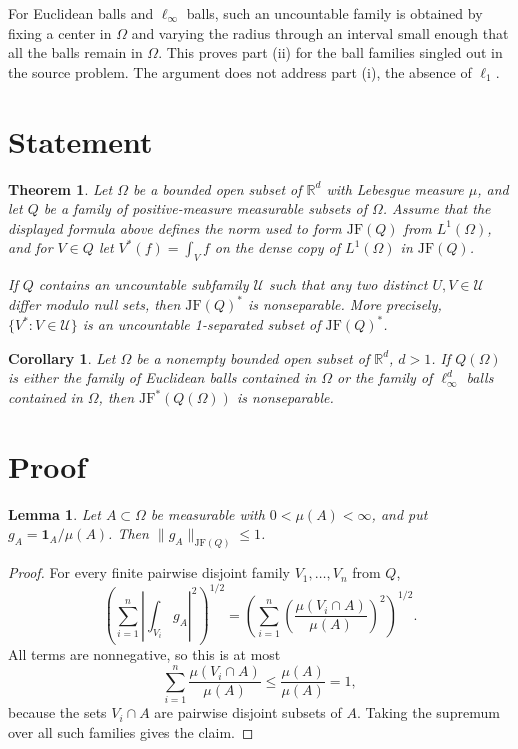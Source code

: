 \documentclass[11pt]{article}
\newtheorem{theorem}{Theorem}
\newtheorem{lemma}{Lemma}
\newtheorem{corollary}{Corollary}
\newcommand{\JF}{\mathrm{JF}}
\newcommand{\R}{\mathbb{R}}
\newcommand{\1}{\mathbf{1}}
\begin{document}
For Euclidean balls and $\ell_\infty$ balls, such an uncountable family is
obtained by fixing a center in $\Omega$ and varying the radius through an
interval small enough that all the balls remain in $\Omega$.  This proves part
(ii) for the ball families singled out in the source problem.  The argument
does not address part (i), the absence of $\ell_1$.

\section{Statement}

\begin{theorem}\label{thm:uncountable-separated}
Let $\Omega$ be a bounded open subset of $\R^d$ with Lebesgue measure $\mu$,
and let $Q$ be a family of positive-measure measurable subsets of $\Omega$.
Assume that the displayed formula above defines the norm used to form
$\JF(Q)$ from $L^1(\Omega)$, and for $V\in Q$ let
$V^*(f)=\int_V f$ on the dense copy of $L^1(\Omega)$ in $\JF(Q)$.

If $Q$ contains an uncountable subfamily $\mathcal U$ such that any two
distinct $U,V\in\mathcal U$ differ modulo null sets, then $\JF(Q)^*$ is
nonseparable.  More precisely, $\{V^*:V\in\mathcal U\}$ is an uncountable
1-separated subset of $\JF(Q)^*$.
\end{theorem}

\begin{corollary}\label{cor:balls}
Let $\Omega$ be a nonempty bounded open subset of $\R^d$, $d>1$.  If
$Q(\Omega)$ is either the family of Euclidean balls contained in $\Omega$ or
the family of $\ell_\infty^d$ balls contained in $\Omega$, then
$\JF^*(Q(\Omega))$ is nonseparable.
\end{corollary}

\section{Proof}

\begin{lemma}\label{lem:indicator-bound}
Let $A\subset\Omega$ be measurable with $0<\mu(A)<\infty$, and put
$g_A=\1_A/\mu(A)$.  Then $\|g_A\|_{\JF(Q)}\leq 1$.
\end{lemma}

\begin{proof}
For every finite pairwise disjoint family $V_1,\ldots,V_n$ from $Q$,
\[
\left(\sum_{i=1}^n \left|\int_{V_i}g_A\right|^2\right)^{1/2}
=
\left(\sum_{i=1}^n \left(\frac{\mu(V_i\cap A)}{\mu(A)}\right)^2\right)^{1/2}.
\]
All terms are nonnegative, so this is at most
\[
\sum_{i=1}^n \frac{\mu(V_i\cap A)}{\mu(A)}
\leq \frac{\mu(A)}{\mu(A)}=1,
\]
because the sets $V_i\cap A$ are pairwise disjoint subsets of $A$.  Taking the
supremum over all such families gives the claim.
\end{proof}
\end{document}

